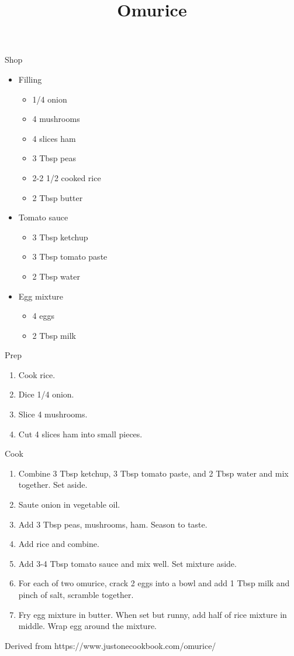 \documentclass{article}
\title{Omurice}
\date{\vspace{-5ex}}
\begin{document}
\maketitle

Shop

\begin{itemize}
	\item Filling
	\begin{itemize}
		\item 1/4 onion
		\item 4 mushrooms
		\item 4 slices ham
		\item 3 Tbsp peas
		\item 2-2 1/2 cooked rice
		\item 2 Tbsp butter
	\end{itemize}
	\item Tomato sauce
	\begin{itemize}
		\item 3 Tbsp ketchup
		\item 3 Tbsp tomato paste
		\item 2 Tbsp water
	\end{itemize}
	\item Egg mixture
	\begin{itemize}
		\item 4 eggs
		\item 2 Tbsp milk
	\end{itemize}
\end{itemize}

Prep

\begin{enumerate}
	\item Cook rice.
	\item Dice 1/4 onion.
	\item Slice 4 mushrooms.
	\item Cut 4 slices ham into small pieces.
\end{enumerate}

Cook

\begin{enumerate}
	\item Combine 3 Tbsp ketchup, 3 Tbsp tomato paste, and 2 Tbsp water and mix together. Set aside.
	\item Saute onion in vegetable oil.
	\item Add 3 Tbsp peas, mushrooms, ham. Season to taste.
	\item Add rice and combine.
	\item Add 3-4 Tbsp tomato sauce and mix well. Set mixture aside.
	\item For each of two omurice, crack 2 eggs into a bowl and add 1 Tbsp milk and pinch of salt, scramble together.
	\item Fry egg mixture in butter. When set but runny, add half of rice mixture in middle. Wrap egg around the mixture.
\end{enumerate}

Derived from https://www.justonecookbook.com/omurice/
\end{document}
